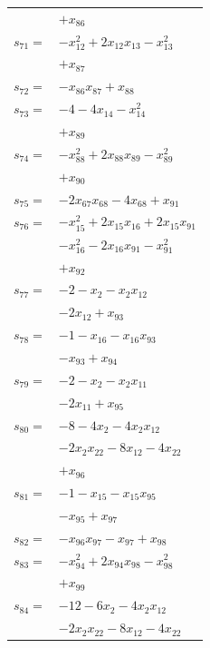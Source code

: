 \begin{longtable}{@{}r@{\;}l@{}}
 & \(\displaystyle +x_{86}\) \\[3pt]
\(s_{71}=\) & \(\displaystyle -x_{12}^{2} +2x_{12}x_{13} -x_{13}^{2}\) \\
 & \(\displaystyle +x_{87}\) \\[3pt]
\(s_{72}=\) & \(\displaystyle -x_{86}x_{87} +x_{88}\) \\[3pt]
\(s_{73}=\) & \(\displaystyle -4 -4x_{14} -x_{14}^{2}\) \\
 & \(\displaystyle +x_{89}\) \\[3pt]
\(s_{74}=\) & \(\displaystyle -x_{88}^{2} +2x_{88}x_{89} -x_{89}^{2}\) \\
 & \(\displaystyle +x_{90}\) \\[3pt]
\(s_{75}=\) & \(\displaystyle -2x_{67}x_{68} -4x_{68} +x_{91}\) \\[3pt]
\(s_{76}=\) & \(\displaystyle -x_{15}^{2} +2x_{15}x_{16} +2x_{15}x_{91}\) \\
 & \(\displaystyle -x_{16}^{2} -2x_{16}x_{91} -x_{91}^{2}\) \\
 & \(\displaystyle +x_{92}\) \\[3pt]
\(s_{77}=\) & \(\displaystyle -2 -x_{2} -x_{2}x_{12}\) \\
 & \(\displaystyle -2x_{12} +x_{93}\) \\[3pt]
\(s_{78}=\) & \(\displaystyle -1 -x_{16} -x_{16}x_{93}\) \\
 & \(\displaystyle -x_{93} +x_{94}\) \\[3pt]
\(s_{79}=\) & \(\displaystyle -2 -x_{2} -x_{2}x_{11}\) \\
 & \(\displaystyle -2x_{11} +x_{95}\) \\[3pt]
\(s_{80}=\) & \(\displaystyle -8 -4x_{2} -4x_{2}x_{12}\) \\
 & \(\displaystyle -2x_{2}x_{22} -8x_{12} -4x_{22}\) \\
 & \(\displaystyle +x_{96}\) \\[3pt]
\(s_{81}=\) & \(\displaystyle -1 -x_{15} -x_{15}x_{95}\) \\
 & \(\displaystyle -x_{95} +x_{97}\) \\[3pt]
\(s_{82}=\) & \(\displaystyle -x_{96}x_{97} -x_{97} +x_{98}\) \\[3pt]
\(s_{83}=\) & \(\displaystyle -x_{94}^{2} +2x_{94}x_{98} -x_{98}^{2}\) \\
 & \(\displaystyle +x_{99}\) \\[3pt]
\(s_{84}=\) & \(\displaystyle -12 -6x_{2} -4x_{2}x_{12}\) \\
 & \(\displaystyle -2x_{2}x_{22} -8x_{12} -4x_{22}\) \\

\end{longtable}

